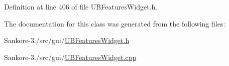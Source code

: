 Definition at line 406 of file U\-B\-Features\-Widget.\-h.



The documentation for this class was generated from the following files\-:\begin{DoxyCompactItemize}
\item 
Sankore-\/3./src/gui/\hyperlink{_u_b_features_widget_8h}{U\-B\-Features\-Widget.\-h}\item 
Sankore-\/3./src/gui/\hyperlink{_u_b_features_widget_8cpp}{U\-B\-Features\-Widget.\-cpp}\end{DoxyCompactItemize}
